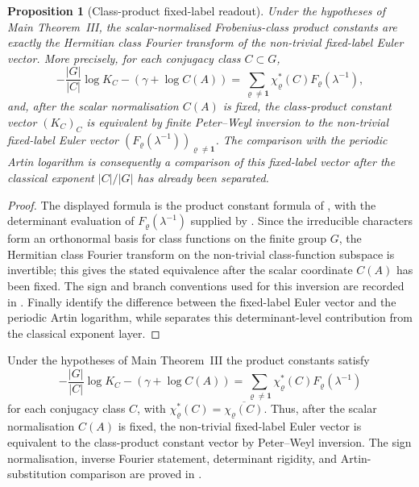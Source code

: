 \documentclass[11pt,a4paper]{amsart}
\theoremstyle{plain}
\newtheorem{proposition}[theorem]{Proposition}
\theoremstyle{definition}
\theoremstyle{remark}
\begin{document}
\begin{proposition}[Class-product fixed-label readout]
  \label{rem:intro-class-product-calibration}
  Under the hypotheses of Main Theorem~III, the scalar-normalised
  Frobenius-class product constants are exactly the Hermitian class Fourier
  transform of the non-trivial fixed-label Euler vector.  More precisely, for
  each conjugacy class \(C\subset G\),
  \[
    -\frac{|G|}{|C|}\log K_C-(\gamma+\log C(A))
    =
    \sum_{\varrho\ne\mathbf1}
      \chi_\varrho^\ast(C)F_\varrho(\lambda^{-1}),
  \]
  and, after the scalar normalisation \(C(A)\) is fixed, the class-product
  constant vector \((K_C)_C\) is equivalent by finite Peter--Weyl inversion to
  the non-trivial fixed-label Euler vector
  \((F_\varrho(\lambda^{-1}))_{\varrho\ne\mathbf1}\).  The comparison with the
  periodic Artin logarithm is consequently a comparison of this fixed-label
  vector after the classical exponent \(|C|/|G|\) has already been separated.
\end{proposition}
\begin{proof}
  The displayed formula is the product constant formula of
  , with the determinant evaluation of
  \(F_\varrho(\lambda^{-1})\) supplied by
  .
  Since the irreducible characters form an orthonormal basis for class
  functions on the finite group \(G\), the Hermitian class Fourier transform on
  the non-trivial class-function subspace is invertible; this gives the stated
  equivalence after the scalar coordinate \(C(A)\) has been fixed.  The sign and
  branch conventions used for this inversion are recorded in
  .
  Finally 
  identify the difference between the fixed-label Euler vector and the periodic
  Artin logarithm, while
   separates this determinant-level
  contribution from the classical exponent layer.
\end{proof}

Under the hypotheses of Main Theorem~III the product constants satisfy
\[
  -\frac{|G|}{|C|}\log K_C-(\gamma+\log C(A))
  =
  \sum_{\varrho\ne\mathbf1}
    \chi_\varrho^\ast(C)F_\varrho(\lambda^{-1})
\]
for each conjugacy class \(C\), with
\(\chi_\varrho^\ast(C)=\overline{\chi_\varrho(C)}\).  Thus, after the scalar
normalisation \(C(A)\) is fixed, the non-trivial fixed-label Euler vector is
equivalent to the class-product constant vector by Peter--Weyl inversion.
The sign normalisation, inverse Fourier statement, determinant rigidity, and
Artin-substitution comparison are proved in
.
\end{document}
